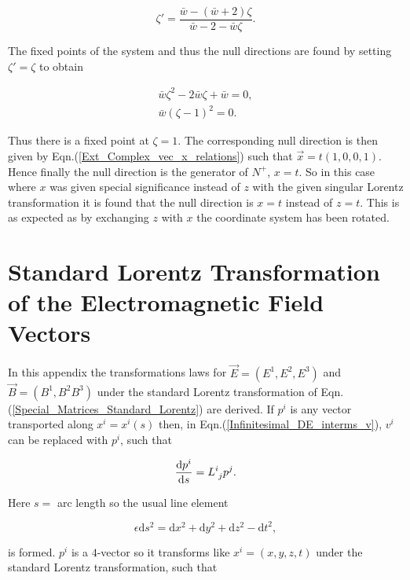 \begin{appendix}
\begin{equation*}
\zeta' = \frac{\bar{w} - (\bar{w} +2)\zeta}{\bar{w} -2 - \bar{w}\zeta}. 
\end{equation*}

\noindent The fixed points of the system and thus the null directions are found by setting $\zeta' = \zeta$ to obtain

\begin{gather*}
\bar{w} \zeta^2 - 2 \bar{w} \zeta + \bar{w} = 0,\\
\bar{w}(\zeta-1)^2 = 0.
\end{gather*}

\noindent Thus there is a fixed point at $\zeta = 1$. The corresponding null direction is then given by Eqn.(\ref{Ext_Complex_vec_x_relations}) such that $\vec{x}= t(1,0,0,1)$. Hence finally the null direction is the generator of $N^+$, $x=t$. So in this case where $x$ was given special significance instead of $z$ with the given singular Lorentz transformation it is found that the null direction is $x=t$ instead of $z=t$. This is as expected as by exchanging $z$ with $x$ the coordinate system has been rotated. 

\section{Standard Lorentz Transformation of the Electromagnetic Field Vectors}\label{Appendix_Standard_Transform_EM_Vectors}

In this appendix the transformations laws for $\vec{E} = (E^1, E^2, E^3)$ and $\vec{B} = (B^1, B^2 B^3)$ under the standard Lorentz transformation of Eqn.(\ref{Special_Matrices_Standard_Lorentz}) are derived. If $p^i$ is any vector transported along $x^i = x^i (s)$ then, in Eqn.(\ref{Infinitesimal_DE_interms_v}), $v^i$ can be replaced with $p^i$, such that

\begin{equation*} 
\frac{\mathrm{d}p^i}{\mathrm{d}s} = \tensor{L}{^i_j} p^j.
\end{equation*} 

\noindent Here $s =$ arc length so the usual line element

\begin{equation*} 
\epsilon \mathrm{d}s^2 = \mathrm{d}x^2 + \mathrm{d}y^2 + \mathrm{d}z^2 - \mathrm{d}t^2,
\end{equation*} 

\noindent is formed. $p^i$ is a $4$-vector so it transforms like $x^i = (x,y,z,t)$ under the standard Lorentz transformation, such that


\end{appendix}
